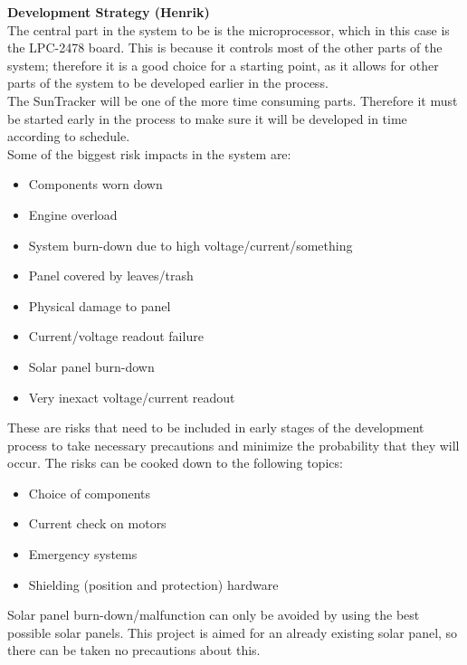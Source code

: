 \documentclass[12pt,a4paper]{report}
\begin{document}
\textbf{Development Strategy (Henrik)}\\

The central part in the system to be is the microprocessor, which in this case is the LPC-2478 board. This is because it controls most of the other parts of the system; therefore it is a good choice for a starting point, as it allows for other parts of the system to be developed earlier in the process.\\

The SunTracker will be one of the more time consuming parts. Therefore it must be started early in the process to make sure it will be developed in time according to schedule.\\

Some of the biggest risk impacts in the system are:
\begin{itemize}
\item Components worn down
\item Engine overload
\item System burn-down due to high voltage/current/something
\item Panel covered by leaves/trash
\item Physical damage to panel
\item Current/voltage readout failure
\item Solar panel burn-down
\item Very inexact voltage/current readout
\end{itemize}

These are risks that need to be included in early stages of the development process to take necessary precautions and minimize the probability that they will occur. The risks can be cooked down to the following topics:\\


\begin{itemize}
\item Choice of components
\item Current check on motors
\item Emergency systems
\item Shielding (position and protection) hardware
\end{itemize}


Solar panel burn-down/malfunction can only be avoided by using the best possible solar panels. This project is aimed for an already existing solar panel, so there can be taken no precautions about this.\\
\end{document}
